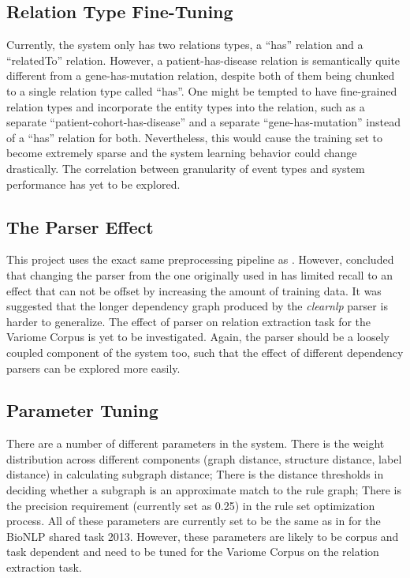 \subsection{Relation Type Fine-Tuning}
Currently, the system only has two relations types, a ``has'' relation and a ``relatedTo'' relation. However, a patient-has-disease relation is semantically quite different from a gene-has-mutation relation, despite both of them being chunked to a single relation type called ``has''. One might be tempted to have fine-grained relation types and incorporate the entity types into the relation, such as a separate ``patient-cohort-has-disease'' and a separate  ``gene-has-mutation'' instead of a ``has'' relation for both. Nevertheless, this would cause the training set to become extremely sparse and the system learning behavior could change drastically. The correlation between granularity of event types and system performance has yet to be explored.  
\subsection{The Parser Effect}
This project uses the exact same preprocessing pipeline as \cite{mackinlay2013extracting}. However, \citet*{mackinlay2013extracting} concluded that changing the parser from the one originally used in \cite{liu2013approximate} has limited recall to an effect that can not be offset by increasing the amount of training data. It was suggested that the longer dependency graph produced by the \emph{clearnlp} parser is harder to generalize. The effect of parser on relation extraction task for the Variome Corpus is yet to be investigated. Again, the parser should be a loosely coupled component of the system too, such that the effect of different dependency parsers can be explored more easily.
\subsection{Parameter Tuning}
There are a number of different parameters in the system. There is the weight distribution across different components (graph distance, structure distance, label distance) in calculating subgraph distance; There is the distance thresholds in deciding whether a subgraph is an approximate match to the rule graph; There is the precision requirement (currently set as 0.25) in the rule set optimization process. All of these parameters are currently set to be the same as in \cite{mackinlay2013extracting} for the BioNLP shared task 2013. However, these parameters are likely to be corpus and task dependent and need to be tuned for the Variome Corpus on the relation extraction task.
